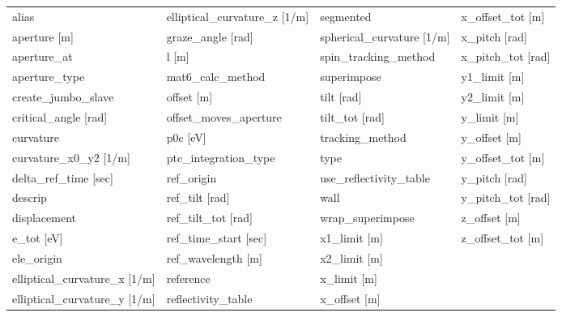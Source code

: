  \begin{tabular}{llll} \toprule
alias                            & elliptical_curvature_z [1/m]     & segmented                        & x_offset_tot [m]                 \\
aperture [m]                     & graze_angle [rad]                & spherical_curvature [1/m]        & x_pitch [rad]                    \\
aperture_at                      & l [m]                            & spin_tracking_method             & x_pitch_tot [rad]                \\
aperture_type                    & mat6_calc_method                 & superimpose                      & y1_limit [m]                     \\
create_jumbo_slave               & offset [m]                       & tilt [rad]                       & y2_limit [m]                     \\
critical_angle [rad]             & offset_moves_aperture            & tilt_tot [rad]                   & y_limit [m]                      \\
curvature                        & p0c [eV]                         & tracking_method                  & y_offset [m]                     \\
curvature_x0_y2 [1/m]            & ptc_integration_type             & type                             & y_offset_tot [m]                 \\
delta_ref_time [sec]             & ref_origin                       & use_reflectivity_table           & y_pitch [rad]                    \\
descrip                          & ref_tilt [rad]                   & wall                             & y_pitch_tot [rad]                \\
displacement                     & ref_tilt_tot [rad]               & wrap_superimpose                 & z_offset [m]                     \\
e_tot [eV]                       & ref_time_start [sec]             & x1_limit [m]                     & z_offset_tot [m]                 \\
ele_origin                       & ref_wavelength [m]               & x2_limit [m]                     &                                  \\
elliptical_curvature_x [1/m]     & reference                        & x_limit [m]                      &                                  \\
elliptical_curvature_y [1/m]     & reflectivity_table               & x_offset [m]                     &                                  \\
 \bottomrule
 \end{tabular}
 \vfill
 
